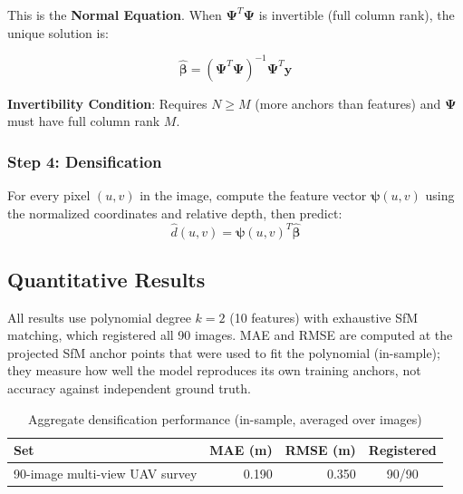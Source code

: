 \documentclass[11pt,a4paper]{article}
\begin{document}
This is the \textbf{Normal Equation}. When $\boldsymbol{\Psi}^T\boldsymbol{\Psi}$ is invertible (full column rank), the unique solution is:

\begin{equation}
\boxed{\hat{\boldsymbol{\beta}} = (\boldsymbol{\Psi}^T\boldsymbol{\Psi})^{-1}\boldsymbol{\Psi}^T\mathbf{y}}
\label{eq:normal}
\end{equation}

\textbf{Invertibility Condition}: Requires $N \geq M$ (more anchors than features) and $\boldsymbol{\Psi}$ must have full column rank $M$.

\subsubsection{Step 4: Densification}

For every pixel $(u, v)$ in the image, compute the feature vector $\boldsymbol{\psi}(u,v)$ using the normalized coordinates and relative depth, then predict:
\begin{equation}
\hat{d}(u,v) = \boldsymbol{\psi}(u,v)^T \hat{\boldsymbol{\beta}}
\end{equation}

\subsection{Quantitative Results}
\label{sec:results}

All results use polynomial degree $k=2$ (10 features) with exhaustive SfM matching, which registered all 90 images. MAE and RMSE are computed at the projected SfM anchor points that were used to fit the polynomial (in-sample); they measure how well the model reproduces its own training anchors, not accuracy against independent ground truth.

\begin{table}[h]
\centering
\caption{Aggregate densification performance (in-sample, averaged over images)}
\begin{tabular}{lrrc}
\toprule
\textbf{Set} & \textbf{MAE (m)} & \textbf{RMSE (m)} & \textbf{Registered} \\
\midrule
90-image multi-view UAV survey & 0.190 & 0.350 & 90/90 \\
\bottomrule
\end{tabular}
\label{tab:results}
\end{table}
\end{document}
